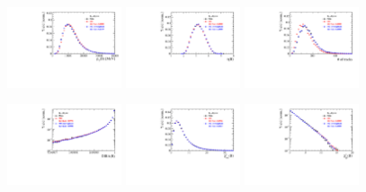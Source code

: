 \begin{figure}[h]
\centering
\includegraphics[height=!,width=0.3\textwidth]{figs/dataVsMC/norm_final/Ds2all_Bs_PT.pdf}
\includegraphics[height=!,width=0.3\textwidth]{figs/dataVsMC/norm_final/Ds2all_Bs_ETA.pdf}
\includegraphics[height=!,width=0.3\textwidth]{figs/dataVsMC/norm_final/Ds2all_NTracks.pdf}

\includegraphics[height=!,width=0.3\textwidth]{figs/dataVsMC/norm_final/Ds2all_Bs_DIRA_OWNPV.pdf}
\includegraphics[height=!,width=0.3\textwidth]{figs/dataVsMC/norm_final/Ds2all_Bs_ENDVERTEX_CHI2.pdf}
\includegraphics[height=!,width=0.3\textwidth]{figs/dataVsMC/norm_final/Ds2all_Bs_IPCHI2_OWNPV.pdf}


\end{figure}
